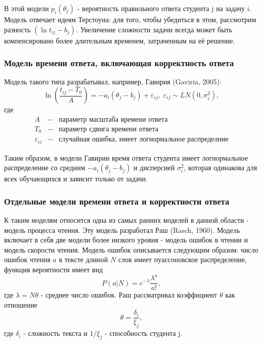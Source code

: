 В этой модели $p_i(\theta_j)$ - вероятность правильного ответа студента j на задачу i. Модель отвечает идеям Терсто\-уна: для того, чтобы убедиться в этом, рас\-смотрим разность $(\ln t_{ij} - b_j)$. Увеличение сложности задачи всегда может быть компенсировано более длительным временем, затра\-ченным на её реше\-ние.

\subsubsection{Модель времени ответа, включающая корректность ответа}

Модель такого типа разрабатывал, например, Гавирия (Gaviria, 2005\cite{17.}):
\begin{equation}
\ln \left( \frac{t_{ij} - T_0}{A}\right) = -a_i(\theta_j - b_j) + \varepsilon_{ij},\; \varepsilon_{ij} \sim LN(0,\sigma_{i}^{2}),
\end{equation}
где
$$
\begin{array}{lll}
A &-& \mbox{параметр масштаба времени ответа}\\
T_0 &-& \mbox{параметр сдвига времени ответа}\\
\varepsilon_{ij} &-& \mbox{случайная ошибка, имеет логнормальное распределние}
\end{array}
$$

Таким образом, в модели Гавирии время ответа студента имеет логнор\-мальное распределение со средним $-a_i(\theta_j - b_j)$ и дисперсией $\sigma_{i}^{2}$, которая одинакова для всех обучающихся и зависит только от задачи.

\subsubsection{Отдельные модели времени ответа и корректности ответа}

К таким моделям относится одна из самых ранних моделей в данной области - модель процесса чтения. Эту модель разработал Раш (Rasch, 1960\cite{36.}). Модель включает в себя две модели более низкого уровня - модель ошибок в чтении и модель скорости чтения.
Модель ошибок описывается следующим образом: число ошибок чтения $a$ в тексте длиной $N$ слов имеет пуассоновское распределение, функция вероятности имеет вид
\begin{equation}
P(a | N) = e^{-\lambda}\frac{\lambda^a}{a!},
\end{equation}
где $\lambda = N\theta$ - среднее число ошибок. Раш рассматривал коэффициент $\theta$ как отношение
\begin{equation}
\theta = \frac{\delta_i}{\xi_j},
\end{equation}
где $\delta_i$ - сложность текста и $1/\xi_j$ - способность студента j.

